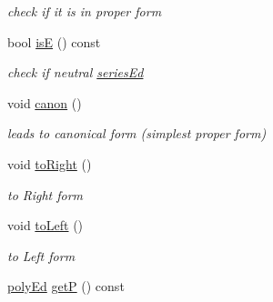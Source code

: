 \begin{DoxyCompactItemize}
\begin{DoxyCompactList}\small\item\em check if it is in proper form \end{DoxyCompactList}\item 
\mbox{\label{classetvo_i_i_1_1series_ed_a7253cad36e8efb6374dfd5e4341efbeb}} 
bool \mbox{\hyperlink{classetvo_i_i_1_1series_ed_a7253cad36e8efb6374dfd5e4341efbeb}{isE}} () const
\begin{DoxyCompactList}\small\item\em check if neutral \mbox{\hyperlink{classetvo_i_i_1_1series_ed}{series\+Ed}} \end{DoxyCompactList}\item 
\mbox{\label{classetvo_i_i_1_1series_ed_af891a5c9bd4d37c263729726208d96f6}} 
void \mbox{\hyperlink{classetvo_i_i_1_1series_ed_af891a5c9bd4d37c263729726208d96f6}{canon}} ()
\begin{DoxyCompactList}\small\item\em leads to canonical form (simplest proper form) \end{DoxyCompactList}\item 
\mbox{\label{classetvo_i_i_1_1series_ed_a81ea31b035d4413c68d62f391221fccb}} 
void \mbox{\hyperlink{classetvo_i_i_1_1series_ed_a81ea31b035d4413c68d62f391221fccb}{to\+Right}} ()
\begin{DoxyCompactList}\small\item\em to Right form \end{DoxyCompactList}\item 
\mbox{\label{classetvo_i_i_1_1series_ed_acfa7eff4586cc0bafdf57222254c0d50}} 
void \mbox{\hyperlink{classetvo_i_i_1_1series_ed_acfa7eff4586cc0bafdf57222254c0d50}{to\+Left}} ()
\begin{DoxyCompactList}\small\item\em to Left form \end{DoxyCompactList}\item 
\mbox{\label{classetvo_i_i_1_1series_ed_af42bdaf41cf1c53fc325b837640bdba4}} 
\mbox{\hyperlink{classetvo_i_i_1_1poly_ed}{poly\+Ed}} \mbox{\hyperlink{classetvo_i_i_1_1series_ed_af42bdaf41cf1c53fc325b837640bdba4}{getP}} () const

\end{DoxyCompactItemize}
